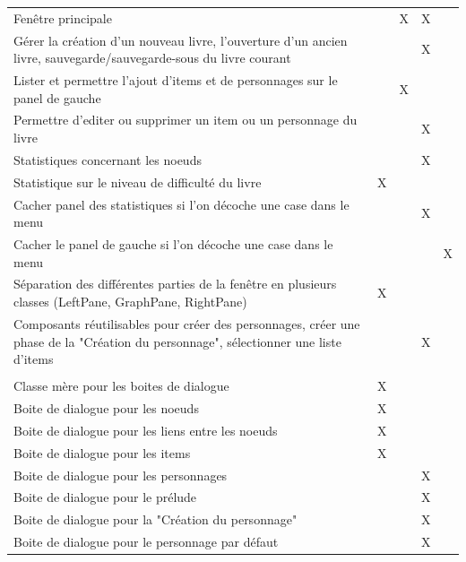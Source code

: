 \begin{centering}
\begin{longtable}{|p{8cm}|c|c|c|c|}
				\rowcolor{lightgray} \multicolumn{5}{|c|}{ \textbf{Fenêtre}}\\
				\hline
				Fenêtre principale & & X & X & \\
				\hline
				Gérer la création d'un nouveau livre, l'ouverture d'un ancien livre, sauvegarde/sauvegarde-sous du livre courant & & & X & \\
				\hline
				Lister et permettre l'ajout d'items et de personnages sur le panel de gauche& & X & & \\
				\hline
				Permettre d'editer ou supprimer un item ou un personnage du livre & & & X & \\
				\hline
				Statistiques concernant les noeuds & & & X & \\
				\hline
				Statistique sur le niveau de difficulté du livre & X & & & \\
				\hline
				Cacher panel des statistiques si l'on décoche une case dans le menu & & & X & \\
				\hline
				Cacher le panel de gauche si l'on décoche une case dans le menu & & & & X\\
				\hline
				Séparation des différentes parties de la fenêtre en plusieurs classes (LeftPane, GraphPane, RightPane) & X & & & \\
				\hline
				Composants réutilisables pour créer des personnages, créer une phase de la "Création du personnage", sélectionner une liste d'items & & & X & \\
				\hline

				\rowcolor{lightgray} \multicolumn{5}{|c|}{ \textbf{Boites de dialogue}}\\
				\hline
				Classe mère pour les boites de dialogue & X & & &\\
				\hline
				Boite de dialogue pour les noeuds & X & & & \\
				\hline
				Boite de dialogue pour les liens entre les noeuds & X & & & \\
				\hline
				Boite de dialogue pour les items & X & & & \\
				\hline
				Boite de dialogue pour les personnages & & & X & \\
				\hline
				Boite de dialogue pour le prélude & & & X & \\
				\hline
				Boite de dialogue pour la "Création du personnage" & & & X & \\
				\hline
				Boite de dialogue pour le personnage par défaut & & & X & \\
				\hline


\end{longtable}
\end{centering}
